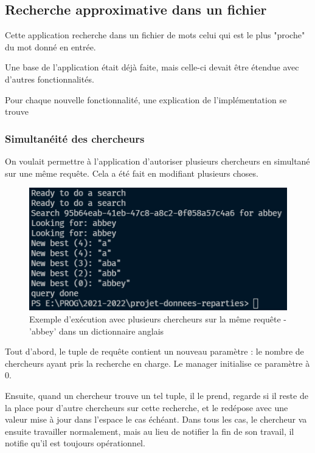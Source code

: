 \documentclass[headings=standardclasses,parskip=half]{scrartcl}
\begin{document}
\subsection{Recherche approximative dans un fichier}

Cette application recherche dans un fichier de mots celui qui est le plus "proche" du mot donné en entrée.

Une base de l'application était déjà faite, mais celle-ci devait être étendue avec d'autres fonctionnalités.

Pour chaque nouvelle fonctionnalité, une explication de l'implémentation se trouve

\subsubsection{Simultanéité des chercheurs}

On voulait permettre à l'application d'autoriser plusieurs chercheurs en simultané sur une même requête.
Cela a été fait en modifiant plusieurs choses.

\begin{figure}[h]
    \centering
    \includegraphics[scale=0.5]{plusieurs-chercheurs.png}
    \caption{Exemple d'exécution avec plusieurs chercheurs sur la même requête 
    - 'abbey' dans un dictionnaire anglais}
\end{figure}

Tout d'abord, le tuple de requête contient un nouveau paramètre : le nombre de chercheurs ayant pris la recherche en charge.
Le manager initialise ce paramètre à 0.

Ensuite, quand un chercheur trouve un tel tuple, il le prend, regarde si il reste de la place pour d'autre chercheurs sur cette recherche,
et le redépose avec une valeur mise à jour dans l'espace le cas échéant.
Dans tous les cas, le chercheur va ensuite travailler normalement, mais au lieu de notifier la fin de son travail, il notifie qu'il 
est toujours opérationnel.
\end{document}
